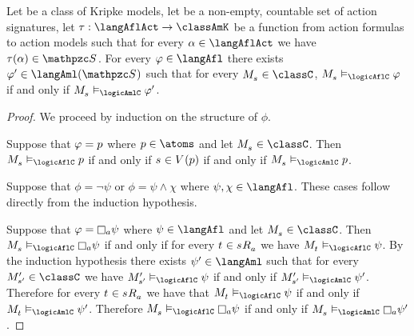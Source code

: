 \begin{lemma}\label{afl-aml}
Let \classC{} be a class of Kripke models, let \aSignatureFamily{} be a non-empty, countable set of action signatures, let $\tau : \langAflAct \to \classAmK$ be a function from action formulas to action models such that for every $\alpha \in \langAflAct$ we have $\tau(\alpha) \in \aSignatureFamily$.
For every $\phi \in \langAfl$ there exists $\phi' \in \langAml(\aSignatureFamily)$ such that for every $\kPModel{\kStateS} \in \classC$, $\kPModel{\kStateS} \entails_\logicAflC \phi$ if and only if $\kPModel{\kStateS} \entails_\logicAmlC \phi'$.
\end{lemma}

\begin{proof}
We proceed by induction on the structure of $\phi$.

Suppose that $\varphi = p$ where $\atomP \in \atoms$ and let $\kPModel{\kStateS} \in \classC$.
Then $\kPModel{\kStateS} \entails_\logicAflC \atomP$ if and only if $\kStateS \in \kValuation(\atomP)$ if and only if $\kPModel{\kStateS} \entails_\logicAmlC \atomP$.

Suppose that $\phi = \lnot \psi$ or $\phi = \psi \land \chi$ where $\psi, \chi \in \langAfl$.
These cases follow directly from the induction hypothesis.

Suppose that $\phi = \necessaryA \psi$ where $\psi \in \langAfl$ and let $\kPModel{\kStateS} \in \classC$.
Then $\kPModel{\kStateS} \entails_\logicAflC \necessaryA \psi$ if and only if for every $\kStateT \in \kSuccessorsA{\kStateS}$ we have $\kPModel{\kStateT} \entails_\logicAflC \psi$.
By the induction hypothesis there exists $\psi' \in \langAml$ such that for every $\kPModelP{\kStateSP} \in \classC$ we have $\kPModelP{\kStateSP} \entails_\logicAflC \psi$ if and only if $\kPModelP{\kStateSP} \entails_\logicAmlC \psi'$.
Therefore for every $\kStateT \in \kSuccessorsA{\kStateS}$ we have that $\kPModel{\kStateT} \entails_\logicAflC \psi$ if and only if $\kPModel{\kStateT} \entails_\logicAmlC \psi'$.
Therefore $\kPModel{\kStateS} \entails_\logicAflC \necessaryA \psi$ if and only if $\kPModel{\kStateS} \entails_\logicAmlC \necessaryA \psi'$.


\end{proof}

